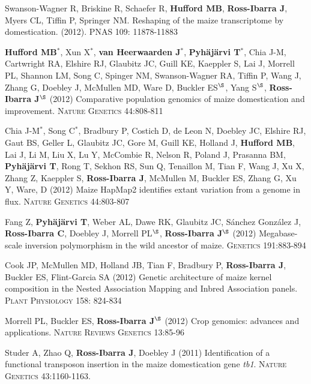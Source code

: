 \documentclass[letterpaper,10pt]{article}
\begin{document}
\begin{etaremune}
\item Swanson-Wagner R, Briskine R, Schaefer R, {\bf Hufford MB}, {\bf Ross-Ibarra J}, Myers CL, Tiffin P, Springer NM.  Reshaping of the maize transcriptome by domestication. (2012). \textsc{PNAS}  109: 11878-11883


\item {\bf Hufford MB}$^*$, Xun X$^*$, {\bf van Heerwaarden J}$^*$, {\bf Pyh\"aj\"arvi T}$^*$, Chia J-M, Cartwright RA, Elshire RJ, Glaubitz JC, Guill KE, Kaeppler S, Lai J, Morrell PL, Shannon LM, Song C, Spinger NM, Swanson-Wagner RA, Tiffin P, Wang J, Zhang G, Doebley J, McMullen MD, Ware D, Buckler ES$^\S$, Yang S$^\S$, {\bf Ross-Ibarra J}$^\S$ (2012) Comparative population genomics of maize domestication and improvement. \textsc{Nature Genetics} 44:808-811 %


\item  Chia J-M$^*$, Song C$^*$, Bradbury P, Costich D, de Leon N, Doebley JC, Elshire RJ, Gaut BS, Geller L, Glaubitz JC, Gore M, Guill KE, Holland J,  {\bf Hufford MB}, Lai J, Li M, Liu X, Lu Y, McCombie R, Nelson R, Poland J, Prasanna BM,  {\bf Pyh\"aj\"arvi T}, Rong T, Sekhon RS,  Sun Q, Tenaillon M, Tian F, Wang J, Xu X, Zhang Z, Kaeppler S, {\bf Ross-Ibarra J}, McMullen M, Buckler ES, Zhang G, Xu Y, Ware, D (2012) Maize HapMap2 identifies extant variation from a genome in flux. \textsc{Nature Genetics} 44:803-807 %


\item Fang Z, {\bf Pyh\"aj\"arvi T}, Weber AL, Dawe RK, Glaubitz JC, S\'{a}nchez Gonz\'{a}lez J, {\bf Ross-Ibarra C}, Doebley J, Morrell PL$^\S$, {\bf Ross-Ibarra J}$^\S$  (2012) Megabase-scale inversion polymorphism in the wild ancestor of maize. \textsc{Genetics} 191:883-894


\item Cook JP, McMullen MD, Holland JB, Tian F, Bradbury P, {\bf Ross-Ibarra J}, Buckler ES, Flint-Garcia SA (2012) Genetic architecture of maize kernel composition in the Nested Association Mapping and Inbred Association panels. \textsc{Plant Physiology} 158: 824-834

\item Morrell PL, Buckler ES, {\bf Ross-Ibarra J}$^\S$ (2012) Crop genomics: advances and applications.  \textsc{Nature Reviews Genetics} 13:85-96 %


\item Studer A, Zhao Q, {\bf Ross-Ibarra J}, Doebley J (2011) Identification of a functional transposon insertion in the maize domestication gene \emph{tb1}.  \textsc{Nature Genetics} 43:1160-1163.



\end{etaremune}
\end{document}

